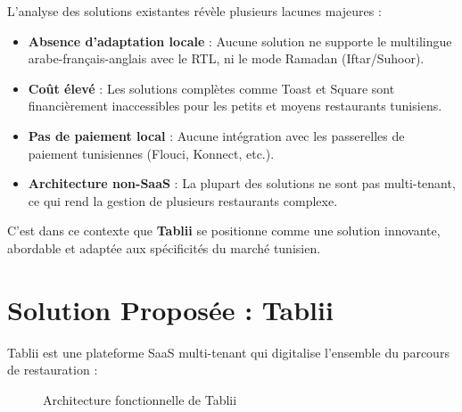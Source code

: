 \documentclass[12pt,a4paper]{report}
\begin{document}
L'analyse des solutions existantes révèle plusieurs lacunes majeures :

\begin{itemize}[leftmargin=1.5cm, itemsep=0.3cm]
    \item \textbf{Absence d'adaptation locale} : Aucune solution ne supporte le multilingue arabe-français-anglais avec le RTL, ni le mode Ramadan (Iftar/Suhoor).
    \item \textbf{Coût élevé} : Les solutions complètes comme Toast et Square sont financièrement inaccessibles pour les petits et moyens restaurants tunisiens.
    \item \textbf{Pas de paiement local} : Aucune intégration avec les passerelles de paiement tunisiennes (Flouci, Konnect, etc.).
    \item \textbf{Architecture non-SaaS} : La plupart des solutions ne sont pas multi-tenant, ce qui rend la gestion de plusieurs restaurants complexe.
\end{itemize}

C'est dans ce contexte que \textbf{Tablii} se positionne comme une solution innovante, abordable et adaptée aux spécificités du marché tunisien.

\section{Solution Proposée : Tablii}

Tablii est une plateforme SaaS multi-tenant qui digitalise l'ensemble du parcours de restauration :

\begin{figure}[H]
    \centering
    \caption{Architecture fonctionnelle de Tablii}
    \label{fig:functional-arch}
\end{figure}
\end{document}
